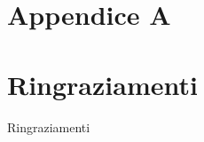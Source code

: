 \documentclass{Configuration_Files/Unive_Thesis}
\begin{document}
\cleardoublepage
{} %
\appendix

\chapter{Appendice A}



\printglossary[type=\acronymtype]

\listoffigures

\listoftables


\chapter*{Ringraziamenti}
Ringraziamenti

\cleardoublepage
\end{document}
